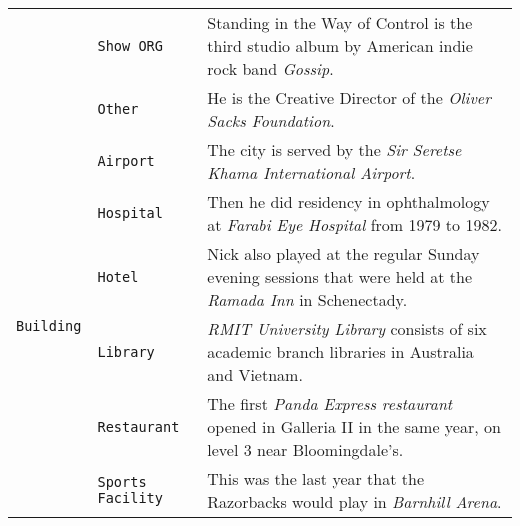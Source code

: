 \documentclass[11pt,a4paper, dvipsnames]{article}
\begin{document}
\begin{longtable}{clp{9.5cm}}
                                              & \texttt{\color{Mahogany}Show ORG}  & Standing in the Way of Control is the third studio album by American indie rock band \textit{\color{Mahogany}Gossip}.                                                   \\ \cmidrule(r){2-2} \cmidrule(r){3-3}
                                              & \texttt{\color{Mahogany}Other}               & He is the Creative Director of the \textit{\color{Mahogany}Oliver Sacks Foundation}.                                                                                    \\ \midrule
\multirow{8}{*}{\color{TealBlue}\texttt{Building}}                     & \texttt{\color{TealBlue}Airport}             & The city is served by the \textit{\color{TealBlue}Sir Seretse Khama International Airport}.                                                                             \\ \cmidrule(r){2-2} \cmidrule(r){3-3}
                                              & \texttt{\color{TealBlue}Hospital}            & Then he did residency in ophthalmology at \textit{\color{TealBlue}Farabi Eye Hospital} from 1979 to 1982.                                                               \\ \cmidrule(r){2-2} \cmidrule(r){3-3}
                                              & \texttt{\color{TealBlue}Hotel}               & Nick also played at the regular Sunday evening sessions that were held at the \textit{\color{TealBlue}Ramada Inn} in Schenectady.                                       \\ \cmidrule(r){2-2} \cmidrule(r){3-3}
                                              & \texttt{\color{TealBlue}Library}             & \textit{\color{TealBlue}RMIT University Library} consists of six academic branch libraries in Australia and Vietnam.                                                    \\ \cmidrule(r){2-2} \cmidrule(r){3-3}
                                              & \texttt{\color{TealBlue}Restaurant}          & The first \textit{\color{TealBlue}Panda Express restaurant} opened in Galleria II in the same year, on level 3 near Bloomingdale's.                                     \\ \cmidrule(r){2-2} \cmidrule(r){3-3}
                                              & \texttt{\color{TealBlue}Sports Facility}    & This was the last year that the Razorbacks would play in \textit{\color{TealBlue}Barnhill Arena}.                                                                       \\ \cmidrule(r){2-2} \cmidrule(r){3-3}

\end{longtable}
\end{document}
